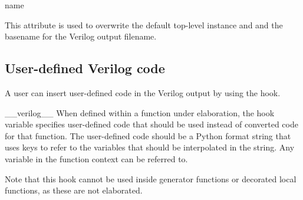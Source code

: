 \begin{memberdesc}[toVerilog]{name}

This attribute is used to overwrite the default top-level instance
and and the basename for the Verilog output filename.

\end{memberdesc}

\subsection{User-defined Verilog code \label{ref-conv-user}}

A user can insert user-defined code in the Verilog output
by using the  hook.

\begin{datadesc}{__verilog__}
When defined within a function under elaboration, the
 hook variable specifies user-defined code that
should be used instead of converted code for that function.  The
user-defined code should be a Python format string that uses keys to
refer to the variables that should be interpolated in the string. Any
variable in the function context can be referred to.

Note that this hook cannot be used inside generator functions or
decorated local functions, as these are not elaborated.
\end{datadesc}
